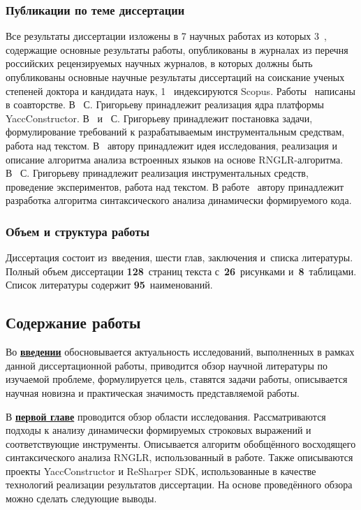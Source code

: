 \subsubsection*{\large{Публикации по теме диссертации}}

 Все результаты диссертации изложены в 7 научных работах из которых 3~\cite{1,2,3}, содержащие основные результаты работы, опубликованы в журналах из перечня российских рецензируемых научных журналов, в которых должны быть опубликованы основные научные результаты диссертаций на соискание ученых степеней доктора и кандидата наук, 1~\cite{4} индексируются Scopus. Работы~\cite{1, 2, 3, 4, 5, 6, 7} написаны в соавторстве. В~\cite{1} С. Григорьеву принадлежит реализация ядра платформы YaccConstructor. В~\cite{2, 3} и~\cite{5} С. Григорьеву принадлежит постановка задачи, формулирование требований к разрабатываемым инструментальным средствам, работа над текстом. В~\cite{4} автору принадлежит идея исследования, реализация и описание алгоритма анализа встроенных языков на основе RNGLR-алгоритма.  В~\cite{6} С. Григорьеву принадлежит реализация инструментальных средств, проведение экспериментов, работа над текстом. В работе~\cite{7} автору принадлежит разработка алгоритма синтаксического анализа динамически формируемого кода.


\subsubsection*{\large{Объем и структура работы}}
Диссертация состоит из~введения, шести глав, заключения и~списка литературы. Полный объем диссертации \textbf{128}~страниц текста с~\textbf{26}~рисунками и~\textbf{8}~таблицами. Список литературы содержит \textbf{95}~наименований.

\subsection*{\Large Содержание работы}
Во \underline{\textbf{введении}} обосновывается актуальность исследований, выполненных в рамках данной диссертационной работы, приводится обзор научной литературы по изучаемой проблеме, формулируется цель, 
ставятся задачи работы, описывается научная новизна и практическая значимость представляемой работы.


В \underline{\textbf{первой главе}} проводится обзор области исследования. Рассматриваются подходы к анализу динамически формируемых строковых выражений и соответствующие инструменты. Описывается алгоритм обобщённого восходящего синтаксического анализа RNGLR, использованный в работе. Также описываются 
проекты YaccConstructor и ReSharper SDK, использованные в качестве технологий реализации результатов диссертации. На основе проведённого обзора можно сделать следующие выводы.

